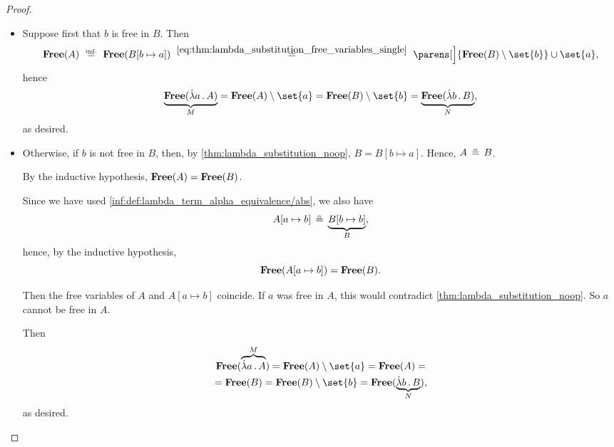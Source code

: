 \begin{proof}
\begin{itemize}
    \begin{itemize}
      \item Suppose first that \( b \) is free in \( B \). Then
      \begin{equation*}
        \op*{Free}(A)
        \reloset{\T{ind.}} =
        \op*{Free}(B[b \mapsto a])
        \reloset {\eqref{eq:thm:lambda_substitution_free_variables_single}} =
        \parens[\Big]{ \op*{Free}(B) \setminus \set{ b } } \cup \set{ a },
      \end{equation*}
      hence
      \begin{equation*}
        \underbrace{\op*{Free}(\qabs a A)}_M
        =
        \op*{Free}(A) \setminus \set{ a }
        =
        \op*{Free}(B) \setminus \set{ b }
        =
        \underbrace{\op*{Free}(\qabs b B)}_N,
      \end{equation*}
      as desired.

      \item Otherwise, if \( b \) is not free in \( B \), then, by \cref{thm:lambda_substitution_noop}, \( B = B[b \mapsto a] \). Hence, \( A \aequiv B \).

      By the inductive hypothesis, \( \op*{Free}(A) = \op*{Free}(B) \).

      Since we have used \ref{inf:def:lambda_term_alpha_equivalence/abs}, we also have
      \begin{equation*}
        A[a \mapsto b] \aequiv \underbrace{B[b \mapsto b]}_B,
      \end{equation*}
      hence, by the inductive hypothesis,
      \begin{equation*}
        \op*{Free}(A[a \mapsto b]) = \op*{Free}(B).
      \end{equation*}

      Then the free variables of \( A \) and \( A[a \mapsto b] \) coincide. If \( a \) was free in \( A \), this would contradict \cref{thm:lambda_substitution_noop}. So \( a \) cannot be free in \( A \).

      Then
      \begin{multline*}
        \op*{Free}(\overbrace{\qabs a A}^M)
        =
        \op*{Free}(A) \setminus \set{ a }
        =
        \op*{Free}(A)
        = \\ =
        \op*{Free}(B)
        =
        \op*{Free}(B) \setminus \set{ b }
        =
        \op*{Free}(\underbrace{\qabs b B}_N),
      \end{multline*}
      as desired.
    \end{itemize}
  \end{itemize}


\end{proof}
